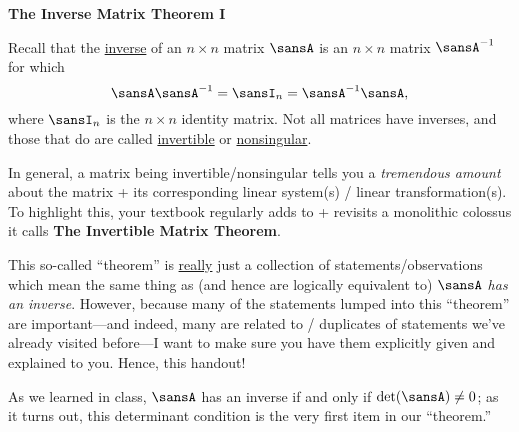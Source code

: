 \documentclass[12 pt]{article}
\begin{document}
\begin{center}
\Large{\textbf{The Inverse Matrix Theorem I}}
\end{center}
Recall that the \ul{inverse} of an $n\times n$ matrix $\sansA$ is an $n\times n$ matrix $\sansA^{-1}$ for which 
\[
	\sansA\sansA^{-1}=\sansI_n=\sansA^{-1}\sansA,
\] 
where $\sansI_n$ is the $n\times n$ identity matrix. Not all matrices have inverses, and those that do are called \ul{invertible} or \ul{nonsingular}.

In general, a matrix being invertible/nonsingular tells you a \textit{tremendous amount} about the matrix + its corresponding linear system(s) / linear transformation(s). To highlight this, your textbook regularly adds to + revisits a monolithic colossus it calls \textbf{The Invertible Matrix Theorem}. 

This so-called ``theorem'' is \ul{really} just a collection of statements/observations which mean the same thing as (and hence are logically equivalent to) \textit{$\sansA$ has an inverse}. However, because many of the statements lumped into this ``theorem'' are important---and indeed, many are related to / duplicates of statements we've already visited before---I want to make sure you have them explicitly given and explained to you. Hence, this handout!

As we learned in class, $\sansA$ has an inverse if and only if $\det(\sansA)\neq 0$; as it turns out, this determinant condition is the very first item in our ``theorem.'' 


\end{document}
